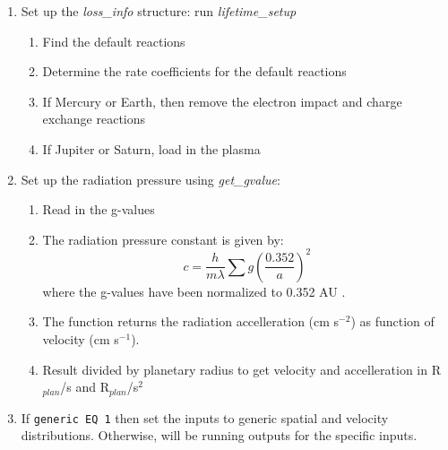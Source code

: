\documentclass[11pt]{article}
\begin{document}
\begin{enumerate}
\item Set up the \textit{loss\_info} structure: run \textit{lifetime\_setup}
  \begin{enumerate}
  \item Find the default reactions
  \item Determine the rate coefficients for the default reactions
  \item If Mercury or Earth, then remove the electron impact and charge exchange
  reactions
  \item If Jupiter or Saturn, load in the plasma
  \end{enumerate}

\item Set up the radiation pressure using \textit{get\_gvalue}:
  \begin{enumerate}
  \item Read in the g-values
  \item The radiation pressure constant is given by:
    \begin{equation}
    c = \frac{h}{m\lambda} \sum g \left(\frac{0.352}{a}\right)^2
    \end{equation}
  where the g-values have been normalized to 0.352 AU \cite{killen2009}.
  \item The function returns the radiation accelleration (cm s$^{-2}$) as function of
  velocity (cm s$^{-1}$).
  \item Result divided by planetary radius to get velocity and accelleration in
  R$_{plan}$/s and R$_{plan}$/s$^{2}$
  \end{enumerate}

\item If \texttt{generic EQ 1} then set the inputs to generic spatial and velocity
distributions. Otherwise, will be running outputs for the specific inputs.


\end{enumerate}
\end{document}
